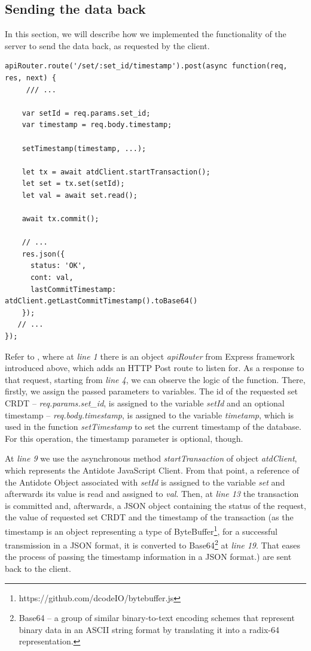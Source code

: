 \subsection*{Sending the data back}

In this section, we will describe how we implemented the functionality of the server to send the data back, as requested by the client.

\begin{lstlisting}[caption={Code for sending back to the client the requested data.}, label={lst:dev1}]
apiRouter.route('/set/:set_id/timestamp').post(async function(req, res, next) {   
     /// ...
    
    var setId = req.params.set_id;
    var timestamp = req.body.timestamp;

    setTimestamp(timestamp, ...);

    let tx = await atdClient.startTransaction();
    let set = tx.set(setId);
    let val = await set.read();

    await tx.commit();

    // ...
    res.json({
      status: 'OK',
      cont: val,
      lastCommitTimestamp: atdClient.getLastCommitTimestamp().toBase64()
    });
   // ... 
});
\end{lstlisting} 

Refer to , where at \textit{line 1} there is an object \textit{apiRouter} from Express framework introduced above, which adds an HTTP Post route to listen for. As a response to that request, starting from \textit{line 4}, we can observe the logic of the function. There, firstly, we assign the passed parameters to variables. The id of the requested set CRDT -- \textit{req.params.set\_id}, is assigned to the variable \textit{setId} and an optional timestamp -- \textit{req.body.timestamp}, is assigned to the variable \textit{timetamp}, which is used in the function \textit{setTimestamp} to set the current timestamp of the database. For this operation, the timestamp parameter is optional, though.

At \textit{line 9} we use the asynchronous method \textit{startTransaction} of object \textit{atdClient}, which represents the Antidote JavaScript Client. From that point, a reference of the Antidote Object associated with \textit{setId} is assigned to the variable \textit{set} and afterwards its value is read and assigned to \textit{val}. Then, at \textit{line 13} the transaction is committed and, afterwards, a JSON object containing the status of the request, the value of requested set CRDT and the timestamp of the transaction (as the timestamp is an object representing a type of ByteBuffer\footnote{https://github.com/dcodeIO/bytebuffer.js}, for a successful transmission in a JSON format, it is converted to Base64\footnote{Base64 -- a group of similar binary-to-text encoding schemes that represent binary data in an ASCII string format by translating it into a radix-64 representation\cite{53}.} at \textit{line 19}. That eases the process of passing the timestamp information in a JSON format.) are sent back to the client.

